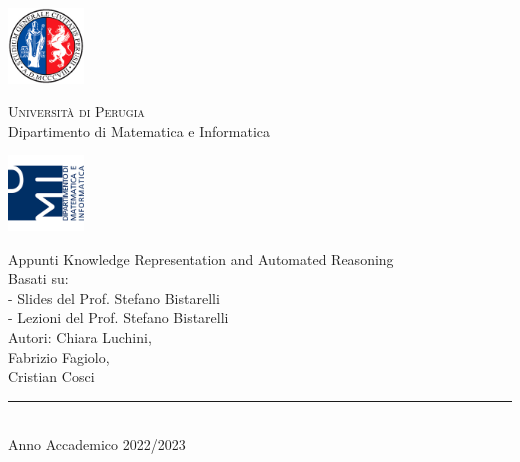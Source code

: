 
\thispagestyle{empty} %

	\noindent %
	\includegraphics[width=0.15\textwidth]{img/logoUniPg}
	\begin{minipage}[b]{0.7\textwidth}
		\centering
		{\Large{\textsc{Universit{\`a} di Perugia}}}\\
		\vspace{0.4 em}
		{\large {Dipartimento di Matematica e Informatica}}
		\vspace{0.6 em}
	\end{minipage}%
	\includegraphics[width=0.15\textwidth]{img/logoDMI}
	
	\vspace{8 em}

	\begin{center}
		

	
		{\Huge{Appunti Knowledge Representation and Automated Reasoning }}\\
		\vspace{5 em}
		{\large {Basati su:}}\\
		{\large {- Slides del Prof. Stefano Bistarelli}}\\
		{\large {- Lezioni del Prof. Stefano Bistarelli}}\\
		\vspace{2 em}
		{\large {Autori: Chiara Luchini,}}\\
        {\large { Fabrizio Fagiolo,}}\\
        {\large { Cristian Cosci}}\\
		
		\vspace{6 em}
		\vfill
		
	{\rule{380pt}{.4pt}}\\
		\vspace{1.2 em}
		\large{{Anno Accademico 2022/2023}}
		
		
		
		
	\end{center}

